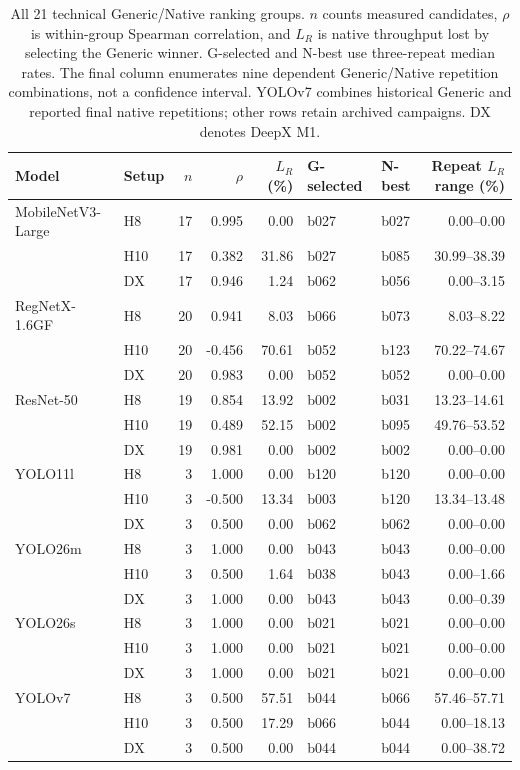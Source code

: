 \begin{table}[!t]
\caption{All 21 technical Generic/Native ranking groups. $n$ counts measured candidates, $\rho$ is within-group Spearman correlation, and $L_R$ is native throughput lost by selecting the Generic winner. G-selected and N-best use three-repeat median rates. The final column enumerates nine dependent Generic/Native repetition combinations, not a confidence interval. YOLOv7 combines historical Generic and reported final native repetitions; other rows retain archived campaigns. DX denotes DeepX M1.}
\label{tab:allgroups}
\centering\small
\setlength{\tabcolsep}{3.0pt}
\begin{tabular*}{\textwidth}{@{\extracolsep{\fill}}llrrrllr@{}}
\toprule
Model & Setup & $n$ & $\rho$ & $L_R$ (\%) & G-selected & N-best & Repeat $L_R$ range (\%)\\
\midrule
MobileNetV3-Large & H8 & 17 & 0.995 & 0.00 & b027 & b027 & 0.00--0.00\\
 & H10 & 17 & 0.382 & 31.86 & b027 & b085 & 30.99--38.39\\
 & DX & 17 & 0.946 & 1.24 & b062 & b056 & 0.00--3.15\\
\addlinespace[2pt]
RegNetX-1.6GF & H8 & 20 & 0.941 & 8.03 & b066 & b073 & 8.03--8.22\\
 & H10 & 20 & -0.456 & 70.61 & b052 & b123 & 70.22--74.67\\
 & DX & 20 & 0.983 & 0.00 & b052 & b052 & 0.00--0.00\\
\addlinespace[2pt]
ResNet-50 & H8 & 19 & 0.854 & 13.92 & b002 & b031 & 13.23--14.61\\
 & H10 & 19 & 0.489 & 52.15 & b002 & b095 & 49.76--53.52\\
 & DX & 19 & 0.981 & 0.00 & b002 & b002 & 0.00--0.00\\
\addlinespace[2pt]
YOLO11l & H8 & 3 & 1.000 & 0.00 & b120 & b120 & 0.00--0.00\\
 & H10 & 3 & -0.500 & 13.34 & b003 & b120 & 13.34--13.48\\
 & DX & 3 & 0.500 & 0.00 & b062 & b062 & 0.00--0.00\\
\addlinespace[2pt]
YOLO26m & H8 & 3 & 1.000 & 0.00 & b043 & b043 & 0.00--0.00\\
 & H10 & 3 & 0.500 & 1.64 & b038 & b043 & 0.00--1.66\\
 & DX & 3 & 1.000 & 0.00 & b043 & b043 & 0.00--0.39\\
\addlinespace[2pt]
YOLO26s & H8 & 3 & 1.000 & 0.00 & b021 & b021 & 0.00--0.00\\
 & H10 & 3 & 1.000 & 0.00 & b021 & b021 & 0.00--0.00\\
 & DX & 3 & 1.000 & 0.00 & b021 & b021 & 0.00--0.00\\
\addlinespace[2pt]
YOLOv7 & H8 & 3 & 0.500 & 57.51 & b044 & b066 & 57.46--57.71\\
 & H10 & 3 & 0.500 & 17.29 & b066 & b044 & 0.00--18.13\\
 & DX & 3 & 0.500 & 0.00 & b044 & b044 & 0.00--38.72\\
\bottomrule
\end{tabular*}
\end{table}
